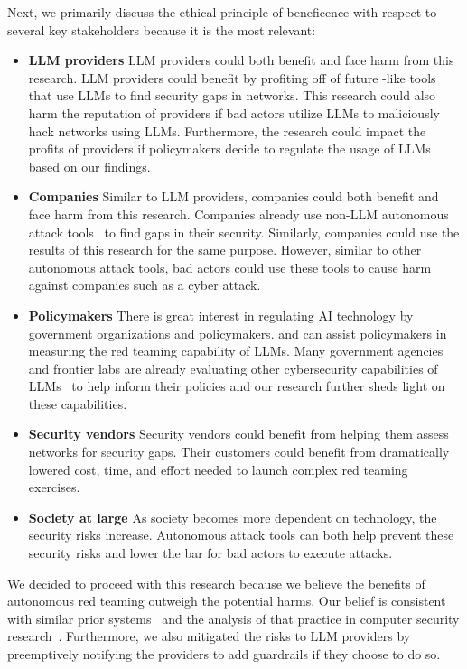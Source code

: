 Next, we primarily discuss the ethical principle of beneficence with respect to several key stakeholders because it is the most relevant:
\begin{itemize}
    \item \textbf{LLM providers} LLM providers could both benefit and face harm from this research.
    LLM providers could benefit by profiting off of future \sys-like tools that use LLMs to find security gaps in networks.
    This research could also harm the reputation of providers if bad actors utilize LLMs to maliciously hack networks using LLMs.
    Furthermore, the research could impact the profits of providers if policymakers decide to regulate the usage of LLMs based on our findings.
    \item \textbf{Companies} Similar to LLM providers, companies could both benefit and face harm from this research.
    Companies already use non-LLM autonomous attack tools~\cite{cobalt, caldera} to find gaps in their security. Similarly, companies could use the results of this research for the same purpose.
    However, similar to other autonomous attack tools, bad actors could use these tools to cause harm against companies such as a cyber attack.
    \item \textbf{Policymakers} There is great interest in regulating AI technology by government organizations and policymakers.
    \sys and \benchmark can assist policymakers in measuring the red teaming capability of LLMs.
    Many government agencies and frontier labs are already evaluating other cybersecurity capabilities of LLMs~\cite{anthropic_AISI, zhang2024cybench, o1systemcard} to help inform their policies and our research further sheds light on these capabilities.
    \item \textbf{Security vendors} Security vendors could benefit from \sys helping them assess networks for security gaps. Their customers could benefit from dramatically lowered cost, time, and effort  needed to launch complex red teaming exercises.

    \item \textbf{Society at large} As society becomes more dependent on technology, the security risks increase. Autonomous attack tools can both help prevent these security risks and lower the bar for bad actors to execute attacks.
\end{itemize}


We decided to proceed with this research because we believe the benefits of autonomous red teaming outweigh the potential harms.
Our belief is consistent with similar prior systems~\cite{pentestgpt, zhang2024cybench, caldera, xu2024autoattacker, Hu2020AutoPentestDRL, metasploit, kouremetis2025occult, wang2025cybergym} and the analysis of that practice in computer security research~\cite{silic2013dual}.
Furthermore, we also mitigated the risks to LLM providers by preemptively notifying the providers to add guardrails if they choose to do so.


